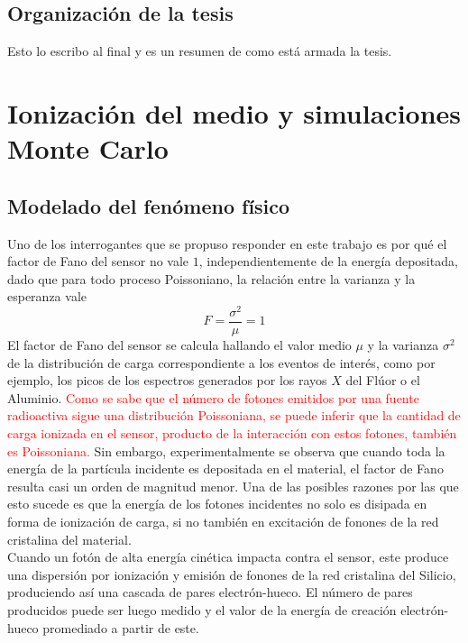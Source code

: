 \section{Organización de la tesis}
Esto lo escribo al final y es un resumen de como está armada la tesis.
\chapter{Ionización del medio y simulaciones Monte Carlo}
\section{Modelado del fenómeno físico}
\noindent Uno de los interrogantes que se propuso responder en este trabajo es por qué el factor de Fano del sensor no vale $1$, independientemente de la energía depositada, dado que para todo proceso Poissoniano, la relación entre la varianza y la esperanza vale
\begin{equation*}
    F = \frac{\sigma^{2}}{\mu} = 1
\end{equation*} 
El factor de Fano del sensor se calcula hallando el valor medio $\mu$ y la varianza $\sigma^{2}$ de la distribución de carga correspondiente a los eventos de interés, como por ejemplo, los picos de los espectros generados por los rayos $X$ del Flúor o el Aluminio. \textcolor{red}{Como se sabe que el número de fotones emitidos por una fuente radioactiva sigue una distribución Poissoniana, se puede inferir que la cantidad de carga ionizada en el sensor, producto de la interacción con estos fotones, también es Poissoniana.} Sin embargo, experimentalmente se observa que cuando toda la energía de la partícula incidente es depositada en el material, el factor de Fano resulta casi un orden de magnitud menor\cite{TesisKevin}. Una de las posibles razones por las que esto sucede es que la energía de los fotones incidentes no solo es disipada en forma de ionización de carga, si no también en excitación de fonones de la red cristalina del material.\\
\indent Cuando un fotón de alta energía cinética impacta contra el sensor, este produce una dispersión por ionización y emisión de fonones de la red cristalina del Silicio, produciendo así una cascada de pares electrón-hueco. El número de pares producidos puede ser luego medido y el valor de la energía de creación electrón-hueco promediado a partir de este.\\
